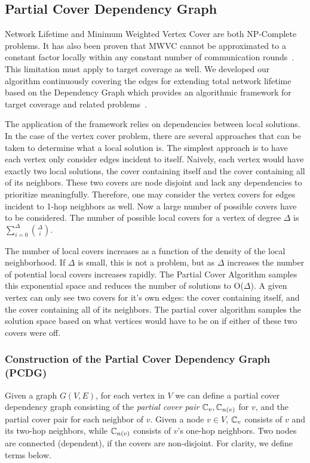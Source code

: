 \subsection{Partial Cover Dependency Graph}
\label{sec:life-depend}
Network Lifetime and Minimum Weighted Vertex Cover are both NP-Complete problems. It has also been proven that MWVC cannot be approximated to a constant factor locally within any constant number of communication rounds~\cite{1011811}. This limitation must apply to target coverage as well. We developed our algorithm continuously covering the edges for extending total network lifetime based on the Dependency Graph which provides an algorithmic framework for target coverage and related problems~\cite{IPDPS.2008.45361}. 

The application of the framework relies on dependencies between local solutions. In the case of the vertex cover problem, there are several approaches that can be taken to determine what a local solution is. The simplest approach is to have each vertex only consider edges incident to itself. Naively, each vertex would have exactly two local solutions, the cover containing itself and the cover containing all of its neighbors. These two covers are node disjoint and lack any dependencies to prioritize meaningfully.   Therefore, one may consider the vertex covers for edges incident to 1-hop neighbors as well. Now a large number of possible covers have to be considered. The number of possible local covers for a vertex of degree $\Delta$ is $\sum_{i=0}^\Delta \binom{\Delta}{i}$. 

\label{sec:PCDG}
The number of local covers increases as a function of the density of the local neighborhood. If $\Delta$ is small, this is not a problem, but as $\Delta$ increases the number of potential local covers increases rapidly. The Partial Cover Algorithm samples this exponential space and reduces the number of solutions to O($\Delta$). A given vertex can only see two covers for it's own edges: the cover containing itself, and the cover containing all of its neighbors. The partial cover algorithm samples the solution space based on what vertices would have to be on if either of these two covers were off. 

\subsubsection{Construction of the  Partial Cover Dependency Graph (PCDG)}

Given a graph $G(V,E)$, for each vertex in $V$ we can define a partial cover dependency graph consisting of the {\em partial cover pair} ${\mathbb C}_v, {\mathbb C}_{n(v)}$ for $v$, and the partial cover pair for each neighbor of $v$. Given a node $v \in V$, ${\mathbb C}_v$ consists of $v$ and its two-hop neighbors, while ${\mathbb C}_{n(v)}$ consists of $v$'s one-hop neighbors. Two nodes are connected (dependent), if the covers are non-disjoint. For clarity, we define terms below.

